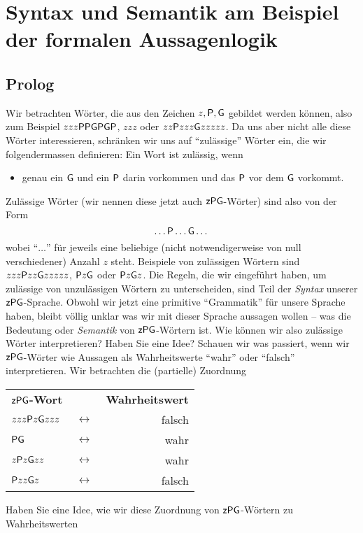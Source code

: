 
\chapter{Syntax und Semantik am Beispiel der formalen Aussagenlogik}

\section*{Prolog}
Wir betrachten Wörter, die aus den Zeichen $z,\mathsf{P},\mathsf{G}$ gebildet werden können, also zum Beispiel $zzz\mathsf{P}\mathsf{P}\mathsf{G}\mathsf{P}\mathsf{G}\mathsf{P}$, $zzz$ oder $zz\mathsf{P} zzz\mathsf{G} zzzzz$. Da uns aber nicht alle diese Wörter interessieren, schränken wir uns auf ``zulässige'' Wörter ein, die wir folgendermassen definieren: Ein Wort ist zulässig, wenn
\begin{itemize}
\item genau ein $\mathsf{G}$ und ein $\mathsf{P}$ darin vorkommen und das $\mathsf{P}$ vor dem $\mathsf{G}$ vorkommt.
\end{itemize}
Zulässige Wörter (wir nennen diese jetzt auch $\mathsf{z}\mathsf{P}\mathsf{G}$-Wörter) sind also von der Form
\[
\dots \mathsf{P}\dots \mathsf{G}\dots
\]
wobei ``$\dots$'' für jeweils eine beliebige (nicht notwendigerweise von null verschiedener) Anzahl
 $z$ steht. Beispiele von zulässigen Wörtern sind $zzz\mathsf{P} zz\mathsf{G} zzzzz$, $\mathsf{P} z\mathsf{G}$ oder $\mathsf{P} z\mathsf{G} z$. Die Regeln,
 die wir eingeführt haben, um zulässige von unzulässigen Wörtern zu unterscheiden, sind Teil der
 \textit{Syntax} unserer $\mathsf{z}\mathsf{P}\mathsf{G}$-Sprache. Obwohl wir jetzt eine primitive ``Grammatik'' für unsere
 Sprache haben, bleibt völlig unklar was wir mit dieser Sprache aussagen wollen -- was die
 Bedeutung oder \textit{Semantik} von $\mathsf{z}\mathsf{P}\mathsf{G}$-Wörtern ist. Wie können wir also zulässige
 Wörter interpretieren? Haben Sie eine Idee? Schauen wir was passiert, wenn wir $\mathsf{z}\mathsf{P}\mathsf{G}$-Wörter wie
 Aussagen als Wahrheitswerte ``wahr'' oder ``falsch'' interpretieren. Wir betrachten die (partielle)
 Zuordnung
\begin{center}
\begin{tabular}{ l c r }
\textbf{$\mathsf{z}\mathsf{P}\mathsf{G}$-Wort}& &\textbf{Wahrheitswert}\\
  $zzz\mathsf{P} z\mathsf{G} zzz$ & $\,\longleftrightarrow\,$ & falsch \\
  $\mathsf{P}\mathsf{G}$ &  $\,\longleftrightarrow\,$ & wahr\\
  $z\mathsf{P} z\mathsf{G} zz$ &  $\,\longleftrightarrow\,$ & wahr\\
  $\mathsf{P} zz\mathsf{G} z$ & $\,\longleftrightarrow\,$ & falsch
\end{tabular}
\end{center}
Haben Sie eine Idee, wie wir diese Zuordnung von $\mathsf{z}\mathsf{P}\mathsf{G}$-Wörtern zu Wahrheitswerten
